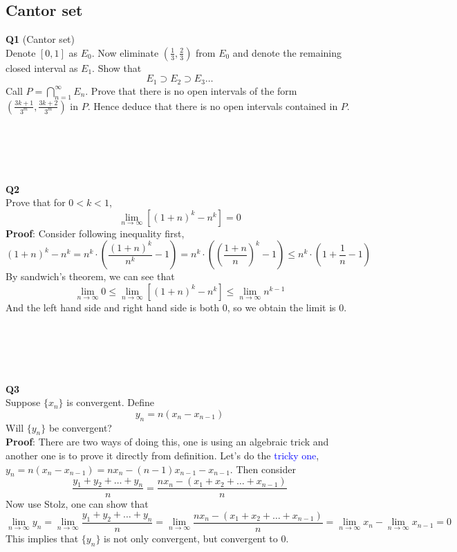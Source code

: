 \documentclass{article}
\newcommand{\tb}[1]{\textbf{#1}}
\begin{document}
\subsection{Cantor set}
\tb{Q1} (Cantor set)\\
Denote $[0,1]$ as $E_0$. Now eliminate $\left(\frac{1}{3},\frac{2}{3}\right)$ from $E_0$ and denote the remaining closed interval as $E_1$. 
Show that 
$$
E_1 \supset E_2 \supset E_3 \dots
$$
Call $P = \bigcap_{n=1}^{\infty} E_n$. Prove that there is no open intervals of the form $\left( \frac{3k+1}{3^m}, \frac{3k+2}{3^m}\right)$ in $P$. Hence deduce 
that there is no open intervals contained in $P$.\\
\\
\\
\\
\\
\\
\tb{Q2}\\
Prove that for $0 < k < 1$, 
$$
\lim_{n \to \infty}[ (1+n)^k - n^k] = 0
$$
\tb{Proof}: Consider following inequality first,
$$
(1+n)^k - n^k = n^k \cdot \left(\frac{(1+n)^k}{n^k} - 1\right) = n^k \cdot \left(\left(\frac{1+n}{n}\right)^k - 1\right) \leq n^k \cdot \left( 1 + \frac{1}{n} - 1\right)
$$
By sandwich's theorem, we can see that 
$$
\lim_{n \to \infty} 0 \leq \lim_{n \to \infty} [ (1+n)^k - n^k] \leq \lim_{n \to \infty} n^{k-1} 
$$
And the left hand side and right hand side is both $0$, so we obtain the limit is $0$.\\
\\
\\
\\
\\
\\
\tb{Q3} \\
Suppose $\{x_n\}$ is convergent. Define 
$$
y_n = n(x_n - x_{n-1})
$$
Will $\{y_n\}$ be convergent?\\
\tb{Proof}: There are two ways of doing this, one is using an algebraic trick and another one is to prove it directly 
from definition. Let's do the \textcolor{blue}{tricky one}, $y_n = n(x_n - x_{n-1}) = nx_n -(n-1)x_{n-1}- x_{n-1}$. Then 
consider 
$$
\frac{y_1 + y_2 + \dots + y_n}{n} = \frac{nx_n - (x_1 + x_2 + \dots + x_{n-1})}{n}
$$
Now use Stolz, one can show that 
$$
\lim_{n \to \infty} y_n  = \lim_{n \to \infty} \frac{y_1 + y_2 + \dots + y_n}{n} = \lim_{n \to \infty}\frac{nx_n - (x_1 + x_2 + \dots + x_{n-1})}{n} = \lim_{n \to \infty} x_n - \lim_{n \to \infty} x_{n-1} = 0
$$
This implies that $\{y_n\}$ is not only convergent, but convergent to $0$.\\
\end{document}
